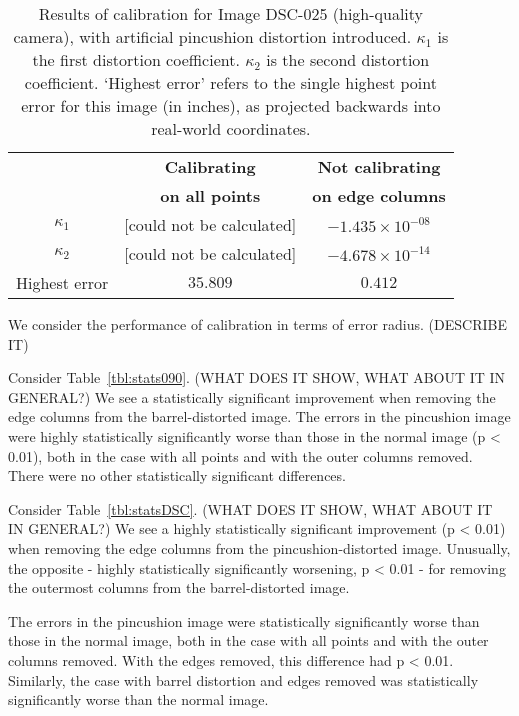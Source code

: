 \begin{table}[h!]
  \centering
  \begin{tabular}{c c c}
    \toprule
    \textbf{ } & \textbf{Calibrating} & \textbf{Not calibrating}\\
    \textbf{ } & \textbf{on all points} & \textbf{on edge columns}\\
    \midrule
    $\kappa_{1}$ & [could not be calculated] & $-1.435 \times 10^{-08}$\\
    $\kappa_{2}$ & [could not be calculated] & $-4.678 \times 10^{-14}$\\
    Highest error & $35.809$ & $0.412$\\
    \bottomrule
  \end{tabular}
  \caption[Results of calibration for Image DSC-025 (high-quality camera) with pincushion distortion]{Results of calibration for Image DSC-025 (high-quality camera), with artificial pincushion distortion introduced. $\kappa_{1}$ is the first distortion coefficient. $\kappa_{2}$ is the second distortion coefficient. `Highest error' refers to the single highest point error for this image (in inches), as projected backwards into real-world coordinates.}
  \label{tbl:calibration-stats-dsc-3}
\end{table}

We consider the performance of calibration in terms of error radius. \cite{TSAI} (DESCRIBE IT)

Consider Table~\ref{tbl:stats090}. (WHAT DOES IT SHOW, WHAT ABOUT IT IN GENERAL?) We see a statistically significant improvement when removing the edge columns from the barrel-distorted image. The errors in the pincushion image were highly statistically significantly worse than those in the normal image (p < 0.01), both in the case with all points and with the outer columns removed. There were no other statistically significant differences.

Consider Table~\ref{tbl:statsDSC}. (WHAT DOES IT SHOW, WHAT ABOUT IT IN GENERAL?) We see a highly statistically significant improvement (p < 0.01) when removing the edge columns from the pincushion-distorted image. Unusually, the opposite - highly statistically significantly worsening, p < 0.01 - for removing the outermost columns from the barrel-distorted image.

The errors in the pincushion image were statistically significantly worse than those in the normal image, both in the case with all points and with the outer columns removed. With the edges removed, this difference had p < 0.01. Similarly, the case with barrel distortion and edges removed was statistically significantly worse than the normal image.

\begin{comment}

\end{comment}



